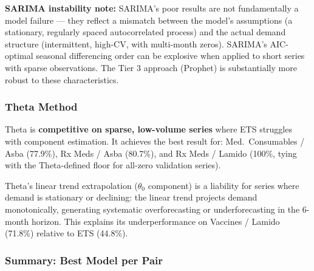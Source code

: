 \documentclass[12pt, a4paper]{article}
\begin{document}
\begin{mdframed}[style=warnbox]
\textbf{SARIMA instability note:} SARIMA's poor results are not
fundamentally a model failure --- they reflect a mismatch between the
model's assumptions (a stationary, regularly spaced autocorrelated
process) and the actual demand structure (intermittent, high-CV, with
multi-month zeros). SARIMA's AIC-optimal seasonal differencing order
can be explosive when applied to short series with sparse observations.
The Tier 3 approach (Prophet) is substantially more robust to these
characteristics.
\end{mdframed}

\subsubsection{Theta Method}

Theta is \textbf{competitive on sparse, low-volume series} where ETS
struggles with component estimation. It achieves the best result for:
Med.\ Consumables / Asba (77.9\%), Rx Meds / Asba (80.7\%), and
Rx Meds / Lamido (100\%, tying with the Theta-defined floor for
all-zero validation series).

Theta's linear trend extrapolation ($\theta_0$ component) is a
liability for series where demand is stationary or declining: the linear
trend projects demand monotonically, generating systematic overforecasting
or underforecasting in the 6-month horizon. This explains its underperformance
on Vaccines / Lamido (71.8\%) relative to ETS (44.8\%).

\subsubsection{Summary: Best Model per Pair}
\end{document}
